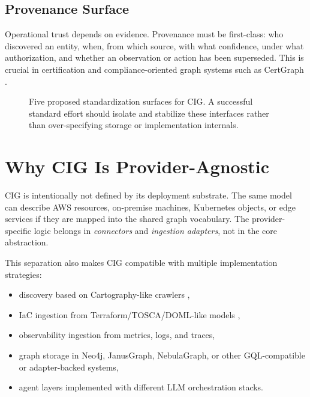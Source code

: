 \documentclass[conference]{IEEEtran}
\begin{document}
\subsection{Provenance Surface}
Operational trust depends on evidence. Provenance must be first-class: who discovered an entity, when, from which source, with what confidence, under what authorization, and whether an observation or action has been superseded. This is crucial in certification and compliance-oriented graph systems such as CertGraph \cite{schoberl2024certgraph}.

\begin{figure}[t]
\centering
{}
\caption{Five proposed standardization surfaces for CIG. A successful standard effort should isolate and stabilize these interfaces rather than over-specifying storage or implementation internals.}
\label{fig:surfaces}
\end{figure}

\section{Why CIG Is Provider-Agnostic}
CIG is intentionally not defined by its deployment substrate. The same model can describe AWS resources, on-premise machines, Kubernetes objects, or edge services if they are mapped into the shared graph vocabulary. The provider-specific logic belongs in \emph{connectors} and \emph{ingestion adapters}, not in the core abstraction.

This separation also makes CIG compatible with multiple implementation strategies:
\begin{itemize}
    \item discovery based on Cartography-like crawlers \cite{cartography2026},
    \item IaC ingestion from Terraform/TOSCA/DOML-like models \cite{vasileiou2025iac,doml2023},
    \item observability ingestion from metrics, logs, and traces,
    \item graph storage in Neo4j, JanusGraph, NebulaGraph, or other GQL-compatible or adapter-backed systems,
    \item agent layers implemented with different LLM orchestration stacks.
\end{itemize}
\end{document}
